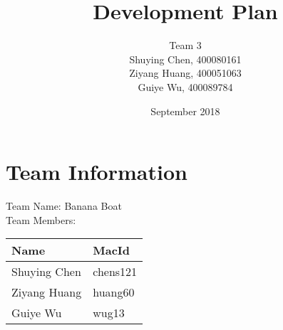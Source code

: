 \documentclass[10pt]{article}
\title{Development Plan}
\author{Team 3\\
        Shuying Chen, 400080161\\
        Ziyang Huang, 400051063\\
        Guiye Wu, 400089784
}
\date{September 2018}
\begin{document}
\maketitle
\newpage



\tableofcontents
\newpage

\section{Team Information}

Team Name: Banana Boat\\
Team Members: 

\begin{table}[h!]
    \begin{center}
	\begin{tabular}{|p{5.0cm}|p{5.0cm}|}
	\hline
	\textbf{Name} & \textbf{MacId}\\
	\hline
      Shuying Chen &  chens121\\
      \hline
      Ziyang Huang& huang60\\
      \hline
      Guiye Wu & wug13\\
      \hline
	\end{tabular}
    \end{center}
	\end{table}
	\renewcommand{\arraystretch}{1}
\newpage
\end{document}
